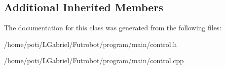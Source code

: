 \subsection*{Additional Inherited Members}


The documentation for this class was generated from the following files\+:\begin{DoxyCompactItemize}
\item 
/home/poti/\+L\+Gabriel/\+Futrobot/program/main/control.\+h\item 
/home/poti/\+L\+Gabriel/\+Futrobot/program/main/control.\+cpp\end{DoxyCompactItemize}

